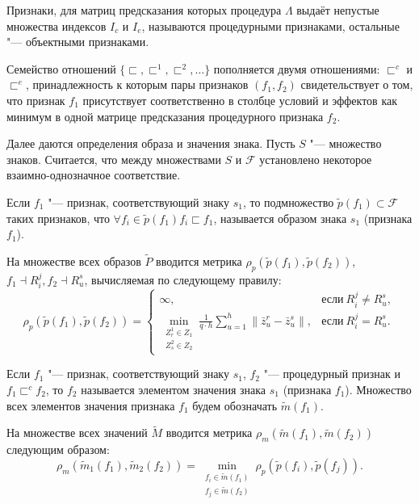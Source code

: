 \begin{Def}
	Признаки, для матриц предсказания которых процедура $\Lambda$ выдаёт непустые множества индексов $I_c$ и $I_e$, называются процедурными признаками, остальные "--- объектными признаками.
\end{Def}

Семейство отношений $\{\sqsubset,\sqsubset^1,\sqsubset^2,\dots\}$ пополняется двумя отношениями: $\sqsubset^c$ и $\sqsubset^e$, принадлежность к которым пары признаков $(f_1,f_2)$ свидетельствует о том, что признак $f_1$ присутствует соответственно в столбце условий и эффектов как минимум в одной матрице предсказания процедурного признака $f_2$.

Далее даются определения образа и значения знака. Пусть $S$ "--- множество знаков. Считается, что между множествами $S$ и $\mathcal F$ установлено некоторое взаимно-однозначное соответствие.

\begin{Def}
	Если $f_1$ "--- признак, соответствующий знаку $s_1$, то подмножество $\tilde p(f_1)\subset\mathcal F$ таких признаков, что $\forall f_i\in\tilde p(f_1) f_i\sqsubset f_1$, называется образом знака $s_1$ (признака $f_1$).
\end{Def}

На множестве всех образов $\tilde P$ вводится метрика $\rho_p(\tilde p(f_1),\tilde p(f_2))$, $f_1\dashv R_i^j, f_2\dashv R_u^s$, вычисляемая по следующему правилу:
\[
\rho_p(\tilde p(f_1),\tilde p(f_2))=
\begin{cases}
\infty, & \text{если}\ R_i^j\not=R_u^s,\\
\min\limits_{\substack{Z_r^1\in Z_1\\Z_s^2\in Z_2}}\frac{1}{q\cdot h}\sum\limits_{u=1}^h\|\bar z_u^r-\bar z_u^s\|, & \text{если}\ R_i^j=R_u^s.
\end{cases}
\]

\begin{Def}
	Если $f_1$ "--- признак, соответствующий знаку $s_1$, $f_2$ "--- процедурный признак и $f_1\sqsubset^c f_2$, то $f_2$ называется элементом значения знака $s_1$ (признака $f_1$). Множество всех элементов значения признака $f_1$ будем обозначать $\tilde m(f_1)$.
\end{Def}

На множестве всех значений $\tilde M$ вводится метрика $\rho_m(\tilde m(f_1),\tilde m(f_2))$ следующим образом:
\[
\rho_m(\tilde m_1(f_1),\tilde m_2(f_2 ))=\min\limits_{\substack{f_i\in\tilde m(f_1 )\\f_j\in\tilde m(f_2 )}}\rho_p(\tilde p(f_i ),\tilde p(f_j )).
\]

